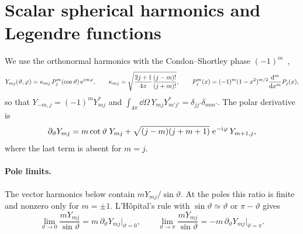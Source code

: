 \documentclass[
    pra,
    aps,
    reprint,
    onecolumn,
    amsmath,amssymb,
    a4paper,
    superscriptaddress,
    10pt,
    nofootinbib
]{revtex4-2}
\newcommand{\iu}{\mathrm{i}\mkern1mu}                 %
\newcommand{\eu}{\mathrm{e}\mkern1mu}                 %
\begin{document}
\section{Scalar spherical harmonics and Legendre functions}
\label{sec:scalar}

We use the orthonormal harmonics with the Condon--Shortley phase $(-1)^m$~\cite{Thesis,Toftul2023PRL},
\begin{equation}
    Y_{mj}(\vartheta, \varphi) = \kappa_{mj}\, P_j^m(\cos\vartheta)\, \eu^{\iu m\varphi}, \qquad
    \kappa_{mj} = \sqrt{\frac{2j+1}{4\pi}\frac{(j-m)!}{(j+m)!}}, \qquad
    P_j^m(x) = (-1)^m (1-x^2)^{m/2} \dv[m]{x} P_j(x),
    \label{eq:Ymj}
\end{equation}
so that $Y_{-m,j} = (-1)^m Y_{mj}^*$ and $\int_{4\pi} \dd\Omega\, Y_{mj} Y^*_{m'j'} = \delta_{jj'}\delta_{mm'}$.
The polar derivative is
\begin{equation}
    \partial_\vartheta Y_{mj} = m \cot\vartheta\; Y_{mj} + \sqrt{(j-m)(j+m+1)}\; \eu^{-\iu\varphi}\, Y_{m+1,j},
    \label{eq:dY}
\end{equation}
where the last term is absent for $m = j$.

\paragraph{Pole limits.}
The vector harmonics below contain $m Y_{mj}/\sin\vartheta$.
At the poles this ratio is finite and nonzero only for $m = \pm 1$.
L'H\^opital's rule with $\sin\vartheta \simeq \vartheta$ or $\pi - \vartheta$ gives
\begin{equation}
    \lim_{\vartheta \to 0} \frac{m Y_{mj}}{\sin\vartheta} = m\, \partial_\vartheta Y_{mj}\big|_{\vartheta = 0}, \qquad
    \lim_{\vartheta \to \pi} \frac{m Y_{mj}}{\sin\vartheta} = -m\, \partial_\vartheta Y_{mj}\big|_{\vartheta = \pi} .
    \label{eq:pole_Y}
\end{equation}
\end{document}
